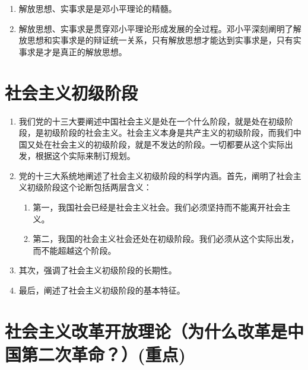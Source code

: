\documentclass[12pt, a4paper, oneside]{ctexbook}
\begin{document}
\begin{enumerate}
\item 解放思想、实事求是是邓小平理论的精髓。

\item 解放思想、实事求是贯穿邓小平理论形成发展的全过程。邓小平深刻阐明了解放思想和实事求是的辩证统一关系，只有解放思想才能达到实事求是，只有实事求是才是真正的解放思想。
\end{enumerate}

\section{社会主义初级阶段}

\begin{enumerate}
\item 我们党的十三大要阐述中国社会主义是处在一个什么阶段，就是处在初级阶段，是初级阶段的社会主义。社会主义本身是共产主义的初级阶段，而我们中国又处在社会主义的初级阶段，就是不发达的阶段。一切都要从这个实际出发，根据这个实际来制订规划。

\item 党的十三大系统地阐述了社会主义初级阶段的科学内涵。首先，阐明了社会主义初级阶段这个论断包括两层含义：

\begin{enumerate}[label=(\arabic*)]
\item 第一，我国社会已经是社会主义社会。我们必须坚持而不能离开社会主义。

\item 第二，我国的社会主义社会还处在初级阶段。我们必须从这个实际出发，而不能超越这个阶段。
\end{enumerate}

\item 其次，强调了社会主义初级阶段的长期性。

\item 最后，阐述了社会主义初级阶段的基本特征。
\end{enumerate}

\section{社会主义改革开放理论（为什么改革是中国第二次革命？）(重点)}
\end{document}
